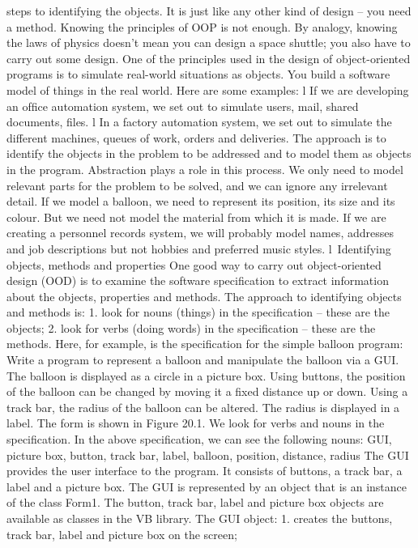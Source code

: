 steps to identifying the objects. It is just like any other kind of design – you need a method. Knowing the principles of OOP is not enough. By analogy, knowing the 
laws of physics doesn’t mean you can design a space shuttle; you also have to carry out some design.
One of the principles used in the design of object-oriented programs is to simulate real-world situations as objects. You build a software model of things in the real world. Here are some examples:
l	If we are developing an ofﬁce automation system, we set out to simulate users, mail, shared documents, ﬁles.
l	In a factory automation system, we set out to simulate the different machines, queues of work, orders and deliveries.
The approach is to identify the objects in the problem to be addressed and to model them as objects in the program.
Abstraction plays a role in this process. We only need to model relevant parts for the problem to be solved, and we can ignore any irrelevant detail. If we model a balloon, we need to represent its position, its size and its colour. But we need not model the material from which it is made. If we are creating a personnel records system, we will probably model names, addresses and job descriptions but not hobbies and preferred music styles.
l Identifying objects, methods and properties
One good way to carry out object-oriented design (OOD) is to examine the software speciﬁcation to extract information about the objects, properties and methods. The approach to identifying objects and methods is:
1.	look for nouns (things) in the speciﬁcation – these are the objects;
2.	look for verbs (doing words) in the speciﬁcation – these are the methods.
Here, for example, is the speciﬁcation for the simple balloon program:
Write a program to represent a balloon and manipulate the balloon via a GUI. The balloon is displayed as a circle in a picture box. Using buttons, the position of the balloon can be changed by moving it a ﬁxed distance up or down. Using a track bar, the radius of the balloon can be altered. The radius is displayed in a label.
The form is shown in Figure 20.1.
We look for verbs and nouns in the speciﬁcation. In the above speciﬁcation, we can see the following nouns:
GUI, picture box, button, track bar, label, balloon, position, distance, radius
The GUI provides the user interface to the program. It consists of buttons, a track bar, a label and a picture box. The GUI is represented by an object that is an instance of the class Form1. The button, track bar, label and picture box objects are available as classes in the VB library.
The GUI object:
1.	creates the buttons, track bar, label and picture box on the screen;
